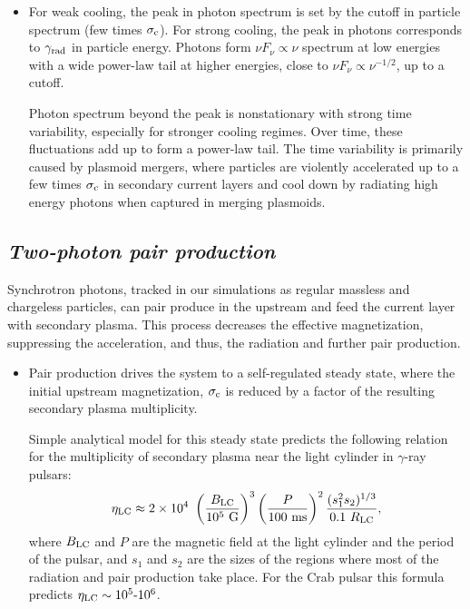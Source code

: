 \begin{itemize}[leftmargin=*,wide = 0pt]
    \item For weak cooling, the peak in photon spectrum is set by the cutoff in particle spectrum (few times $\sigma_{\rm c}$). For strong cooling, the peak in photons corresponds to $\gamma_{\rm rad}$ in particle energy. Photons form $\nu F_{\nu}\propto \nu$ spectrum at low energies with a wide power-law tail at higher energies, close to $\nu F_{\nu}\propto \nu^{-1/2}$, up to a cutoff.

    Photon spectrum beyond the peak is nonstationary with strong time variability, especially for stronger cooling regimes. Over time, these fluctuations add up to form a power-law tail. The time variability is primarily caused by plasmoid mergers, where particles are violently accelerated up to a few times $\sigma_{\rm c}$ in secondary current layers and cool down by radiating high energy photons when captured in merging plasmoids.

\end{itemize}

\subsection*{\small \it Two-photon pair production}

Synchrotron photons, tracked in our simulations as regular massless and chargeless particles, can pair produce in the upstream and feed the current layer with secondary plasma. This process decreases the effective magnetization, suppressing the acceleration, and thus, the radiation and further pair production.

\begin{itemize}[leftmargin=*,wide = 0pt]
    \item Pair production drives the system to a self-regulated steady state, where the initial upstream magnetization, $\sigma_{\rm c}$ is reduced by a factor of the resulting secondary plasma multiplicity.

    Simple analytical model for this steady state predicts the following relation for the multiplicity of secondary plasma near the light cylinder in $\gamma$-ray pulsars:
    \begin{equation}
        \label{eq:eta_th}
        \eta_{\rm LC} \approx 2\times 10^4~
        \left(\frac{B_{\rm LC}}{10^5~\text{G}}\right)^{3}
        \left(\frac{P}{100~\text{ms}}\right)^{2}
        \frac{(s_1^2 s_2)^{1/3}}{0.1~R_{\rm LC}},
    \end{equation}
    where $B_{\rm LC}$ and $P$ are the magnetic field at the light cylinder and the period of the pulsar, and $s_1$ and $s_2$ are the sizes of the regions where most of the radiation and pair production take place. For the Crab pulsar this formula predicts $\eta_{\rm LC} \sim 10^5\text{-}10^6$.
\end{itemize}

